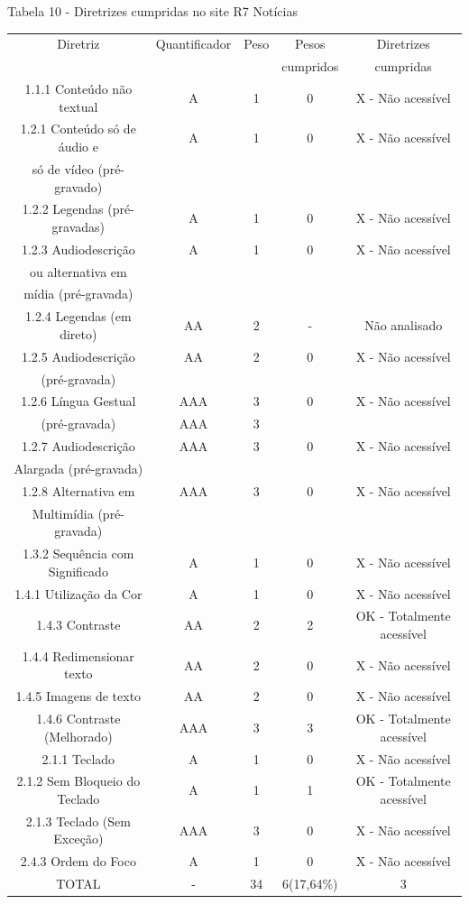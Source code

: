 \documentclass[a4paper]{article}
\begin{document}
\begin{titlepage}
Tabela 10 - Diretrizes cumpridas no site R7 Notícias\\[-1cm]
\begin{center}
	\fontsize{8pt}{8pt}\selectfont	
	\begin{longtable}{|c|c|c|c|c|}
		\hline
		Diretriz & Quantificador & Peso & Pesos & Diretrizes\\
		& & & cumpridos & cumpridas\\
		\hline
		1.1.1 Conteúdo não textual & A & 1 & 0 & X - Não acessível \\
		\hline
		1.2.1 Conteúdo só de áudio e & A & 1 & 0 & X - Não acessível \\
		só de vídeo (pré-gravado) & & & & \\
		\hline
		1.2.2 Legendas (pré-gravadas) & A & 1 & 0 & X - Não acessível \\
		\hline
		1.2.3 Audiodescrição & A & 1 & 0 & X - Não acessível \\
		ou alternativa em & & & & \\
		mídia (pré-gravada) & & & & \\
		\hline
		1.2.4 Legendas (em direto) & AA & 2 & - & Não analisado \\
		\hline
		1.2.5 Audiodescrição & AA & 2 & 0 & X - Não acessível \\
		(pré-gravada) & & & & \\
		\hline
		1.2.6 Língua Gestual & AAA & 3 & 0 & X - Não acessível \\
		(pré-gravada) & AAA & 3 & & \\
		\hline
		1.2.7 Audiodescrição & AAA & 3 & 0 & X - Não acessível \\
		Alargada (pré-gravada) & & & & \\
		\hline
		1.2.8 Alternativa em & AAA & 3 & 0 & X - Não acessível \\
		Multimídia (pré-gravada) & & & & \\
		\hline
		1.3.2 Sequência com Significado & A & 1 & 0 & X - Não acessível \\
		\hline
		1.4.1 Utilização da Cor & A & 1 & 0 & X - Não acessível  \\
		\hline
		1.4.3 Contraste & AA & 2 & 2 & OK - Totalmente acessível \\
		\hline
		1.4.4 Redimensionar texto & AA & 2 & 0 & X - Não acessível \\
		\hline
		1.4.5 Imagens de texto & AA & 2 & 0 & X - Não acessível \\
		\hline
		1.4.6 Contraste (Melhorado) & AAA & 3 & 3 & OK - Totalmente acessível\\
		\hline
		2.1.1 Teclado & A & 1 & 0 & X - Não acessível \\
		\hline
		2.1.2 Sem Bloqueio do Teclado & A & 1 & 1 & OK - Totalmente acessível \\
		\hline
		2.1.3 Teclado (Sem Exceção) & AAA & 3 & 0 & X - Não acessível \\
		\hline
		2.4.3 Ordem do Foco & A & 1 & 0 & X - Não acessível \\
		\hline
		TOTAL & - & 34 & 6(17,64\%) & 3 \\
		\hline
	\end{longtable}
\end{center}


\end{titlepage}
\end{document}
